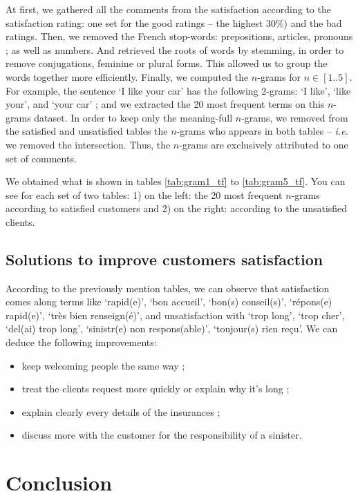 \documentclass[a4paper, 11pt]{article}
\begin{document}
        At first, we gathered all the comments from the satisfaction according to the satisfaction rating: one set for the good ratings -- the highest 30\%) and the bad ratings.
        Then, we removed the French stop-words: prepositions, articles, pronouns ; as well as numbers. And retrieved the roots of words by stemming, in order to remove conjugations, feminine or plural forms. This allowed us to group the words together more efficiently.
        Finally, we computed the $n$-grams for $n \in [1..5]$. For example, the sentence `I like your car' has the following 2-grams: `I like', `like your', and `your car' ;
        and we extracted the 20 most frequent terms on this $n$-grams dataset.
        In order to keep only the meaning-full $n$-grams, we removed from the satisfied and unsatisfied tables the $n$-grams who appears in both tables -- \textit{i.e.} we removed the intersection. Thus, the $n$-grams are exclusively attributed to one set of comments.

        We obtained what is shown in tables \ref{tab:gram1_tf} to \ref{tab:gram5_tf}. You can see for each set of two tables: 1) on the left: the 20 most frequent $n$-grams according to satisfied customers and 2) on the right: according to the unsatisfied clients.

    \subsection{Solutions to improve customers satisfaction}
        According to the previously mention tables, we can observe that satisfaction comes along terms like `rapid(e)', `bon accueil', `bon(s) conseil(s)', `répons(e) rapid(e)', `très bien renseign(é)', and unsatisfaction with `trop long', `trop cher', `del(ai) trop long', `sinistr(e) non respons(able)', `toujour(s) rien reçu'.
        We can deduce the following improvements:
        \begin{itemize}
            \item keep welcoming people the same way ;
            \item treat the clients request more quickly or explain why it's long ;
            \item explain clearly every details of the insurances ;
            \item discuss more with the customer for the responsibility of a sinister.
        \end{itemize}

     
\section{Conclusion}
\label{sec:ccl}
\end{document}
